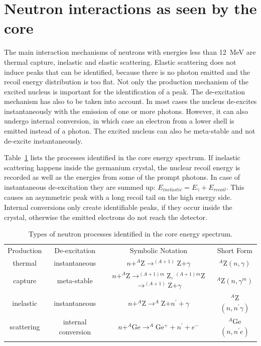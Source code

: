 \section{Neutron interactions as seen by the core}
\label{sec:neu:type}
The main interaction mechanisms of neutrons with energies less than 12~MeV are thermal capture, inelastic and elastic scattering. Elastic scattering does not induce peaks that can be identified, because there is no photon emitted and the recoil energy distribution is too flat. Not only the production mechanism of the excited nucleus is important for the identification of a peak. The de-excitation mechanism has also to be taken into account. In most cases the nucleus de-excites instantaneously with the emission of one or more photons. However, it can also undergo internal conversion, in which case an electron from a lower shell is emitted instead of a photon. The excited nucleus can also be meta-stable and not de-excite instantaneously.

Table~\ref{tab:neu:type} lists the processes identified in the core energy spectrum. If inelastic scattering happens inside the germanium crystal, the nuclear recoil energy is recorded as well as the energies from some of the prompt photons. In case of instantaneous de-excitation they are summed up: $E_{inelastic} = E_{\gamma} + E_{recoil}$. This causes an asymmetric peak with a long recoil tail on the high energy side. Internal conversions only create identifiable peaks, if they occur inside the crystal, otherwise the emitted electrons do not reach the detector.

\begin{table}[tbhp]
  \caption{Types of neutron processes identified in the core energy
    spectrum.}
  \label{tab:neu:type}\centering
  \begin{tabular*}{\textwidth}{@{\extracolsep{\fill}}cccc}
    \hline\noalign{\smallskip}
    Production & De-excitation & Symbolic Notation & Short Form \\
    \noalign{\smallskip}\hline\noalign{\smallskip}
    thermal & instantaneous & $n + ^A$Z$ \rightarrow ^{(A+1)}$Z$ +
\gamma$ & $^A$Z$(n,\gamma)$\\
    \noalign{\smallskip}\cline{2-4}\noalign{\smallskip}
    capture & meta-stable 
    & $n + ^A$Z$ \rightarrow ^{(A+1)m}$Z, $^{(A+1)m}$Z$ \rightarrow
^{(A+1)}$Z$+\gamma$ & $^A$Z$(n,\gamma^{m})$\\
    \noalign{\smallskip}\hline\noalign{\smallskip}
    inelastic & instantaneous & 
    $n + ^A$Z$ \rightarrow ^A$Z$ + n^\prime + \gamma$ &
$^A$Z$(n,n^\prime\gamma)$\\
    \noalign{\smallskip}\cline{2-4}\noalign{\smallskip}
    scattering & internal conversion & 
    $n + ^A$Ge$ \rightarrow ^A$Ge$^{+} + n^\prime + e^-$ &
$^A$Ge$(n,n^\prime e)$\\
    \noalign{\smallskip}\hline
  \end{tabular*}
\end{table}

